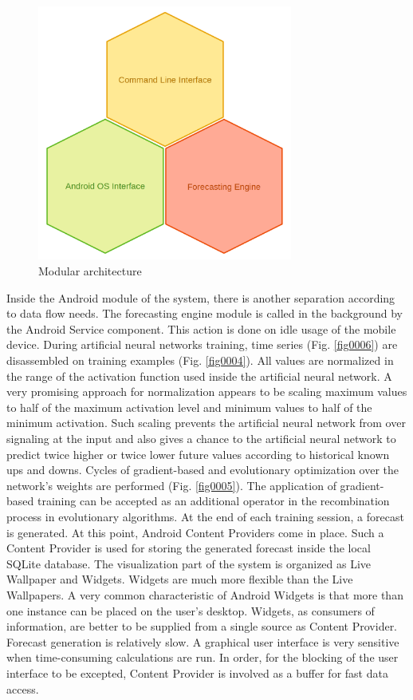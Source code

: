 \documentclass{ifacconf}
\begin{document}
\begin{figure}
\begin{center}
\includegraphics[width=8.4cm]{images/fig0003}
\caption{Modular architecture} 
\label{fig0003}
\end{center}
\end{figure}

Inside the Android module of the system, there is another separation according to data flow needs. The forecasting engine module is called in the background by the Android Service component. This action is done on idle usage of the mobile device. During artificial neural networks training, time series (Fig. \ref{fig0006}) are disassembled on training examples (Fig. \ref{fig0004}). All values are normalized in the range of the activation function used inside the artificial neural network. A very promising approach for normalization appears to be scaling maximum values to half of the maximum activation level and minimum values to half of the minimum activation. Such scaling prevents the artificial neural network from over signaling at the input and also gives a chance to the artificial neural network to predict twice higher or twice lower future values according to historical known ups and downs. Cycles of gradient-based and evolutionary optimization over the network's weights are performed (Fig. \ref{fig0005}). The application of gradient-based training can be accepted as an additional operator in the recombination process in evolutionary algorithms. At the end of each training session, a forecast is generated. At this point, Android Content Providers come in place. Such a Content Provider is used for storing the generated forecast inside the local SQLite database. The visualization part of the system is organized as Live Wallpaper and Widgets. Widgets are much more flexible than the Live Wallpapers. A very common characteristic of Android Widgets is that more than one instance can be placed on the user's desktop. Widgets, as consumers of information, are better to be supplied from a single source as Content Provider. Forecast generation is relatively slow. A graphical user interface is very sensitive when time-consuming calculations are run. In order, for the blocking of the user interface to be excepted, Content Provider is involved as a buffer for fast data access.
\end{document}
